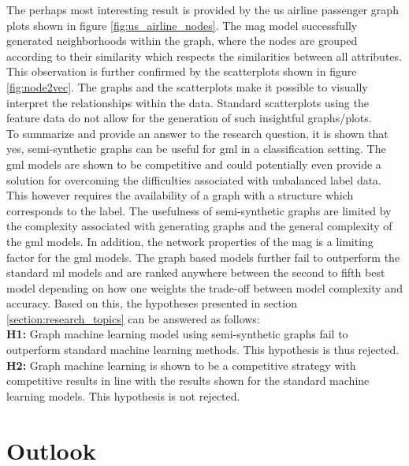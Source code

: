   \noindent The perhaps most interesting result is provided by the \acs{us} 
  airline passenger graph plots shown in figure \ref{fig:us_airline_nodes}. The 
  \acs{mag} model successfully generated neighborhoods within the graph, where 
  the nodes are grouped according to their similarity which respects the 
  similarities between all attributes. This observation is further confirmed 
  by the scatterplots shown in figure \ref{fig:node2vec}. The graphs and the 
  scatterplots make it possible to visually interpret the relationships within 
  the data. Standard scatterplots using the feature data do not allow for the 
  generation of such insightful graphs/plots. \\

  \noindent To summarize and provide an answer to the research question, it is
  shown that yes, semi-synthetic graphs can be useful for \acs{gml} in a
  classification setting. The \acs{gml} models are shown to be competitive and 
  could potentially even provide a solution for overcoming the difficulties 
  associated with unbalanced label data. This however requires the availability 
  of a graph with a structure which corresponds to the label. The usefulness of 
  semi-synthetic graphs are limited by the complexity associated with generating 
  graphs and the general complexity of the \acs{gml} models. In addition, the
  network properties of the \acs{mag} is a limiting factor for the \acs{gml}
  models. The graph based models further fail to outperform the standard 
  \acs{ml} models and are ranked anywhere between the second to fifth best model 
  depending on how one weights the trade-off between model complexity and accuracy. 
  Based on this, the hypotheses presented in section 
  \ref{section:research_topics} can be answered as follows: \\

  \noindent\textbf{H1:} Graph machine learning model using semi-synthetic graphs 
  fail to outperform standard machine learning methods. This hypothesis is thus
  rejected. \\

  \noindent\textbf{H2:} Graph machine learning is shown to be a competitive
  strategy with competitive results in line with the results shown for the
  standard machine learning models. This hypothesis is not rejected.

  \section{Outlook}

